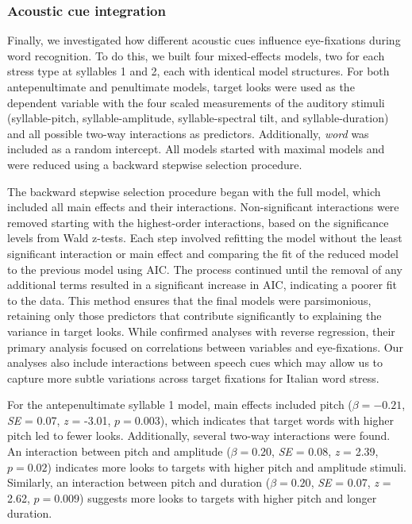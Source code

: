 \subsubsection{Acoustic cue integration}

Finally, we investigated how different acoustic cues influence eye-fixations during word recognition. To do this, we built four mixed-effects models, two for each stress type at syllables 1 and 2, each with identical model structures. For both antepenultimate and penultimate models, target looks were used as the dependent variable with the four scaled measurements of the auditory stimuli (syllable-pitch, syllable-amplitude, syllable-spectral tilt, and syllable-duration) and all possible two-way interactions as predictors. Additionally, \textit{word} was included as a random intercept. All models started with maximal models and were reduced using a backward stepwise selection procedure. 

The backward stepwise selection procedure began with the full model, which included all main effects and their interactions. Non-significant interactions were removed starting with the highest-order interactions, based on the significance levels from Wald z-tests. Each step involved refitting the model without the least significant interaction or main effect and comparing the fit of the reduced model to the previous model using AIC. The process continued until the removal of any additional terms resulted in a significant increase in AIC, indicating a poorer fit to the data. This method ensures that the final models were parsimonious, retaining only those predictors that contribute significantly to explaining the variance in target looks. While \cite{Sulpizio_McQueen_2012} confirmed analyses with reverse regression, their primary analysis focused on correlations between variables and eye-fixations. Our analyses also include interactions between speech cues which may allow us to capture more subtle variations across target fixations for Italian word stress.

For the antepenultimate syllable 1 model, main effects included pitch ($\beta= -0.21$, \textit{SE} = 0.07, \textit{z} = -3.01, $p = 0.003$), which indicates that target words with higher pitch led to fewer looks. Additionally, several two-way interactions were found. An interaction between pitch and amplitude ($\beta= 0.20$, \textit{SE} = 0.08, \textit{z} = 2.39, $p = 0.02$) indicates more looks to targets with higher pitch and amplitude stimuli. Similarly, an interaction between pitch and duration ($\beta= 0.20$, \textit{SE} = 0.07, \textit{z} = 2.62, $p = 0.009$) suggests more looks to targets with higher pitch and longer duration. 

